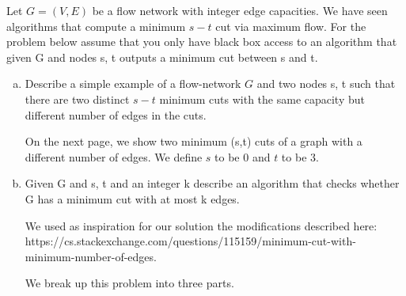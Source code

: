 \documentclass[11pt]{article}
\begin{document}



Let $G = (V, E)$ be a flow network with integer edge capacities. We have seen algorithms that
compute a minimum $s-t$ cut via maximum flow. For the problem below assume that you only
have black box access to an algorithm that given G and nodes s, t outputs a minimum cut
between s and t.

\begin{enumerate}[(a)]
\item
Describe a simple example of a flow-network $G$ and two nodes s, t such that there are two distinct $s-t$ minimum cuts with the same capacity but different number of edges in the cuts. 

\begin{solution}
On the next page, we show two minimum (s,t) cuts of a graph with a different number of edges. We define $s$ to be $0$ and $t$ to be $3$.
\end{solution}




\clearpage
{}

\item Given G and s, t and an integer k describe an algorithm that checks whether G has a minimum cut with at most k edges.
\begin{solution} We used as inspiration for our solution the modifications described here: \\ https://cs.stackexchange.com/questions/115159/minimum-cut-with-minimum-number-of-edges. 

We break up this problem into three parts. 


\end{solution}
\end{enumerate}
\end{document}
